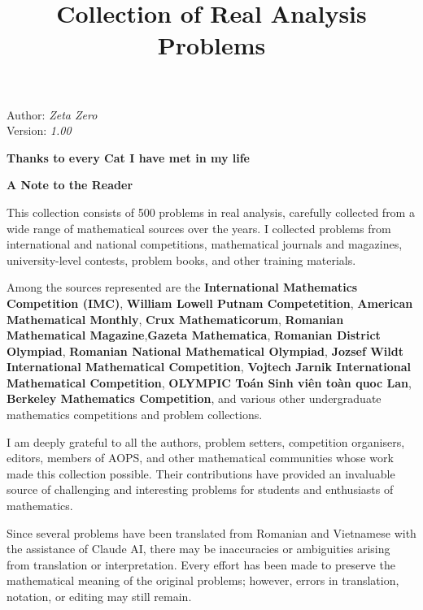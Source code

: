 \documentclass[12pt]{article}
\title{\Huge\bfseries Collection of Real Analysis Problems}
\author{}
\date{}
\begin{document}
\maketitle

\begin{center}
	\small Author: \textit{Zeta Zero}\\
	\small Version: \textit{1.00}
\end{center}

\newpage
\begin{center}
	\vspace*{\fill}
	
	\textbf{Thanks to every Cat I have met in my life}
	
	
	\vspace*{\fill}
\end{center}

\newpage

\begin{center}
	{\LARGE\bfseries A Note to the Reader}
\end{center}

This collection consists of 500 problems in real analysis, carefully collected from a wide range of mathematical sources over the years. I collected problems from international and national competitions, mathematical journals and magazines, university-level contests, problem books, and other training materials.

Among the sources represented are the \textbf{International Mathematics Competition (IMC)}, \textbf{William Lowell Putnam Competetition}, \textbf{American Mathematical Monthly}, \textbf{Crux Mathematicorum}, \textbf{Romanian Mathematical Magazine},\textbf{Gazeta Mathematica}, \textbf{Romanian District Olympiad}, \textbf{Romanian National Mathematical Olympiad}, \textbf{Jozsef Wildt International Mathematical Competition}, \textbf{Vojtech Jarnik International Mathematical Competition}, \textbf{OLYMPIC Toán Sinh viên toàn quoc Lan}, \textbf{Berkeley Mathematics Competition}, and various other undergraduate mathematics competitions and problem collections.

I am deeply grateful to all the authors, problem setters, competition organisers, editors, members of AOPS, and other mathematical communities whose work made this collection possible. Their contributions have provided an invaluable source of challenging and interesting problems for students and enthusiasts of mathematics.

Since several problems have been translated from Romanian and Vietnamese with the assistance of Claude AI, there may be inaccuracies or ambiguities arising from translation or interpretation. Every effort has been made to preserve the mathematical meaning of the original problems; however, errors in translation, notation, or editing may still remain.
\medskip
\end{document}
